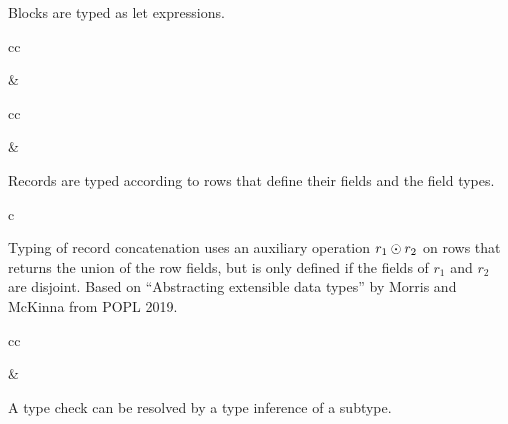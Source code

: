 \documentclass[11pt]{article}
\begin{document}
Blocks are typed as let expressions.

\begin{rules}{cc}


&


\end{rules}

\begin{rules}{cc}


&


\end{rules}

Records are typed according to rows that define their fields and the field types.

\begin{rules}{c}


\end{rules}

Typing of record concatenation uses an auxiliary operation $r_1 \odot r_2$ on rows that returns the union of the row fields, but is only defined if the fields of $r_1$ and $r_2$ are disjoint.
Based on ``Abstracting extensible data types'' by Morris and McKinna from POPL 2019.

\begin{rules}{cc}


&


\end{rules}

A type check can be resolved by a type inference of a subtype.
\end{document}

